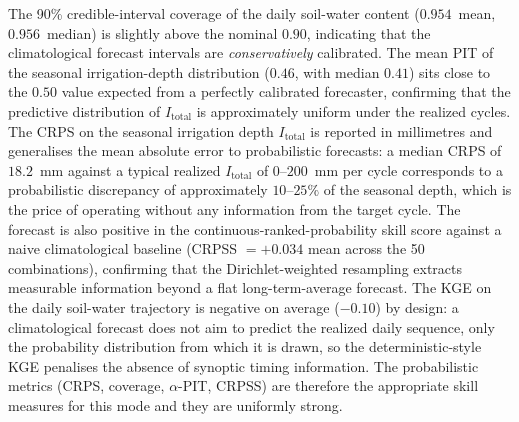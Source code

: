 \documentclass[review,5p,times]{elsarticle}
\begin{document}


The 90\% credible-interval coverage of the daily soil-water content
($0.954$~mean, $0.956$~median) is slightly above the nominal $0.90$,
indicating that the climatological forecast intervals are
\emph{conservatively} calibrated. The mean PIT of the seasonal
irrigation-depth distribution ($0.46$, with median $0.41$) sits close
to the $0.50$ value expected from a perfectly calibrated forecaster,
confirming that the predictive distribution of $I_{\mathrm{total}}$
is approximately uniform under the realized cycles. The CRPS on the
seasonal irrigation depth $I_{\mathrm{total}}$ is reported in
millimetres and generalises the mean absolute error to probabilistic
forecasts: a median CRPS of $18.2$~mm against a typical realized
$I_{\mathrm{total}}$ of $0$--$200$~mm per cycle corresponds to a
probabilistic discrepancy of approximately $10$--$25\%$ of the
seasonal depth, which is the price of operating without any
information from the target cycle. The forecast is also positive in
the continuous-ranked-probability skill score against a naive
climatological baseline (CRPSS $= +0.034$ mean across the 50
combinations), confirming that the Dirichlet-weighted resampling
extracts measurable information beyond a flat long-term-average
forecast. The KGE on the daily soil-water trajectory is negative on
average ($-0.10$) by design: a climatological forecast does not aim
to predict the realized daily sequence, only the probability
distribution from which it is drawn, so the deterministic-style KGE
penalises the absence of synoptic timing information. The
probabilistic metrics (CRPS, coverage, $\alpha$-PIT, CRPSS) are
therefore the appropriate skill measures for this mode and they are
uniformly strong.
\end{document}
